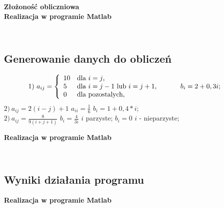 \documentclass[a4paper, 11pt]{article}
\begin{document}
\textbf{Złożoność obliczniowa}\\

\textbf{Realizacja w programie Matlab}\\
\\

\begin{lstlisting}

\end{lstlisting}


\subsection{Generowanie danych do obliczeń}


$$
1) \ a_{ij} = \left\{ \begin{array}{ll}
10 & \textrm{dla $i=j$,}\\
5 & \textrm{dla $i=j-1$ lub $i=j+1$, \hspace{1cm} $b_{i} = 2+0,3i$;}\\
0 & \textrm{dla pozostalych,}
\end{array} \right.
$$
\hspace{3cm} $2) \ a_{ij} = 2(i-j)+1$ \hspace{1cm} $a_{ii} = \frac{1}{6}$ \hspace{1cm} $b_{i} =1+0,4*i$; \\

\hspace{2,4cm} $2) \ a_{ij} = \frac{8}{9(i+j+1)}$  \hspace{1cm} $b_{i} =\frac{4}{3i}$ $i$ parzyste; $b_{i} = 0$ $i$ - nieparzyste; \\

\vspace{1cm}

\textbf{Realizacja w programie Matlab}\\
\\
\begin{lstlisting}

\end{lstlisting}

\subsection{Wyniki działania programu}


\textbf{Realizacja w programie Matlab}\\
\\
\begin{lstlisting}

\end{lstlisting}
\end{document}
